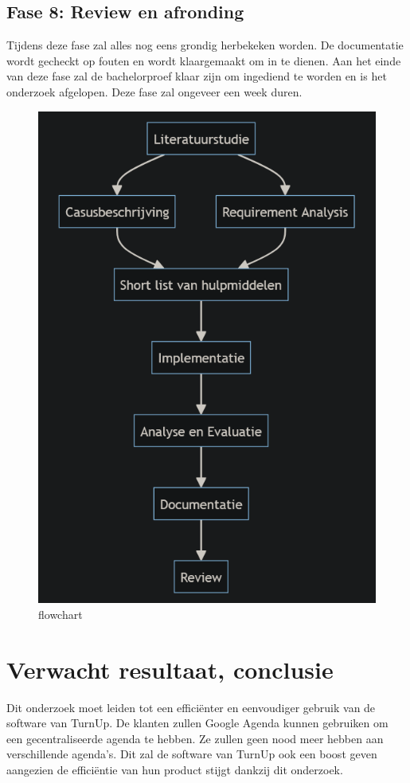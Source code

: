 \subsection{Fase 8: Review en afronding}
Tijdens deze fase zal alles nog eens grondig herbekeken worden. 
De documentatie wordt gecheckt op fouten en wordt klaargemaakt om in te dienen. 
Aan het einde van deze fase zal de bachelorproef klaar zijn om ingediend te worden en is het onderzoek afgelopen.
Deze fase zal ongeveer een week duren. 
\begin{figure}
    \centering
    \includegraphics[width=0.7\linewidth]{graphics/flowchart}
    \caption{flowchart}
    \label{fig:flowchart}
\end{figure}

\section{Verwacht resultaat, conclusie}%
\label{sec:verwachte_resultaten}
Dit onderzoek moet leiden tot een efficiënter en eenvoudiger gebruik van de software van TurnUp. De klanten zullen Google Agenda kunnen gebruiken om een gecentraliseerde agenda te hebben. 
Ze zullen geen nood meer hebben aan verschillende agenda's.
Dit zal de software van TurnUp ook een boost geven aangezien de efficiëntie van hun product stijgt dankzij dit onderzoek. 


